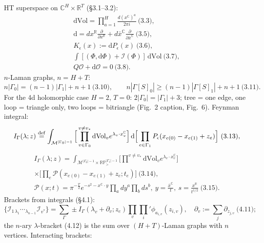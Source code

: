 \documentclass[10pt]{article}
\begin{document}
HT superspace on $\mathbb C^H\times\mathbb R^T$ (\S3.1--3.2):
\begin{gather*}
\mathrm{dVol}=\prod_{a=1}^H\frac{d(x^{\mathbb C})^a}{2\pi i}\ \text{(3.3)},\\
\mathrm d=dx^{\mathbb R}\frac{\partial}{\partial x^{\mathbb R}}+d\bar x^{\mathbb C}\frac{\partial}{\partial\bar x^{\mathbb C}}\ \text{(3.5)},\\
K_\epsilon(x):=\mathrm dP_\epsilon(x)\ \text{(3.6)},\\
\int[(\Phi,\mathrm d\Phi)+\mathcal I(\Phi)]\,\mathrm{dVol}\ \text{(3.7)},\\
Q\mathcal O+\mathrm d\mathcal O=0\ \text{(3.8)}.
\end{gather*}
$n$-Laman graphs, $n=H+T$:
\begin{equation*}
n|\Gamma_0|=(n-1)|\Gamma_1|+n+1\ \text{(3.10)},\qquad n|\Gamma[S]_0|\ge(n-1)|\Gamma[S]_1|+n+1\ \text{(3.11)}.
\end{equation*}
For the 4d holomorphic case $H=2$, $T=0$: $2|\Gamma_0|=|\Gamma_1|+3$; tree = one edge, one loop = triangle only, two loops = bitriangle (Fig.~2 caption, Fig.~6). Feynman integral:
\begin{equation*}
I_\Gamma(\lambda;z)\overset{\rm def}{=}\int_{\mathcal M^{|\Gamma_0|-1}}\Big[\prod_{v\in\Gamma_0}^{v\neq v_*}\mathrm{dVol}_ve^{\lambda_v\cdot x^{\mathbb C}_v}\Big]\,\mathrm d\Big[\prod_{e\in\Gamma_1}P_\epsilon(x_{e(0)}-x_{e(1)}+z_e)\Big]\ \text{(3.13)},
\end{equation*}
\begin{gather*}
I_\Gamma(\lambda;z)=\int_{\mathcal M^{|\Gamma_0|-1}\times\mathbb{RP}^{|\Gamma_1|-1}_>}\Big[\prod^{v\neq v_*}\mathrm{dVol}_ve^{\lambda_v\cdot x^{\mathbb C}_v}\Big]\\\times\Big[\prod_{e}\mathcal P(x_{e(0)}-x_{e(1)}+z_e;t_e)\Big]\ \text{(3.14)},\\
\mathcal P(x;t)=\pi^{-\frac T2}e^{-s^2-x^{\mathbb C}\cdot y}\prod_a dy^a\prod_b ds^b,\ y=\frac{\bar x^{\mathbb C}}t,\ s=\frac{x^{\mathbb R}}{t^{1/2}}\ \text{(3.15)}.
\end{gather*}
Brackets from integrals (\S4.1):
\begin{equation*}
\{\mathcal I_{1\,\lambda_1}\cdots{}_{\lambda_{n-1}}\mathcal I_{v^*}\}=\sum_\Gamma\pm I_\Gamma(\lambda_v+\partial_v;z_e)\prod_v\prod_i{}'\phi_{a_{i,v}}(z_{i,v}),\quad\partial_v:=\textstyle\sum_j\partial_{z_{j,v}}\ \text{(4.11)};
\end{equation*}
the $n$-ary $\lambda$-bracket (4.12) is the sum over $(H+T)$-Laman graphs with $n$ vertices. Interacting brackets:
\end{document}
